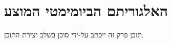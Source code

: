 \section{האלגוריתם הביומימטי המוצע}
\label{sec:algorithm}

תוכן פרק זה ייכתב על-ידי סוכן  בשלב יצירת התוכן.
